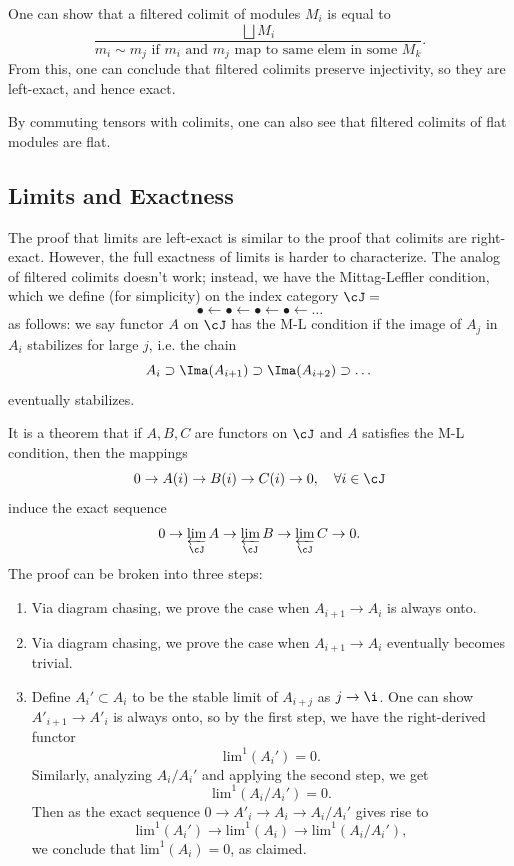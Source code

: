 One can show that a filtered colimit of modules $M_i$ is equal to
\[
    \frac{\bigsqcup M_i}{m_i \sim m_j \text{ if $m_i$ and $m_j$ map to same elem in some $M_k$}}.
\]
From this, one can conclude that filtered colimits preserve injectivity, so they are left-exact, and hence exact.

By commuting tensors with colimits, one can also see that filtered colimits of flat modules are flat.

\subsection{Limits and Exactness}
The proof that limits are left-exact is similar to the proof that colimits are right-exact. However, the full exactness of limits is harder to characterize. The analog of filtered colimits doesn't work; instead, we have the Mittag-Leffler condition, which we define (for simplicity) on the index category $\cJ =$
\[
    \bullet \leftarrow \bullet \leftarrow \bullet \leftarrow \bullet \leftarrow \dots
\]
as follows: we say functor $A$ on $\cJ$ has the M-L condition if the image of $A_j$ in $A_i$ stabilizes for large $j$, i.e. the chain
\[
    A_i \supset \Ima(A_{i+1}) \supset \Ima(A_{i+2}) \supset \dots
\]
eventually stabilizes.

It is a theorem that if $A,B,C$ are functors on $\cJ$ and $A$ satisfies the M-L condition, then the mappings
\[
    0 \to A(i) \to B(i) \to C(i) \to 0, \quad \forall i \in \cJ
\]
induce the exact sequence
\[
    0 \to \varprojlim_{\cJ}A \to \varprojlim_{\cJ}B \to \varprojlim_{\cJ}C \to 0.
\]
The proof can be broken into three steps:
\begin{enumerate}
    \item Via diagram chasing, we prove the case when $A_{i+1} \to A_i$ is always onto.
    \item Via diagram chasing, we prove the case when $A_{i+1} \to A_i$ eventually becomes trivial.
    \item Define $A_i' \subset A_i$ to be the stable limit of $A_{i+j}$ as $j \to \i$. One can show $A'_{i+1} \to A'_i$ is always onto, so by the first step, we have the right-derived functor
    \[
        \text{lim}^1(A_i') = 0.
    \]
    Similarly, analyzing $A_i/A_i'$ and applying the second step, we get
    \[
        \text{lim}^1(A_i/A_i') = 0.
    \]
    Then as the exact sequence $0 \to A'_i \to A_i \to A_i/A_i'$ gives rise to
    \[
        \text{lim}^1(A_i') \to \text{lim}^1(A_i) \to \text{lim}^1(A_i/A_i'),
    \]
    we conclude that $\text{lim}^1(A_i) = 0$, as claimed.
\end{enumerate}

